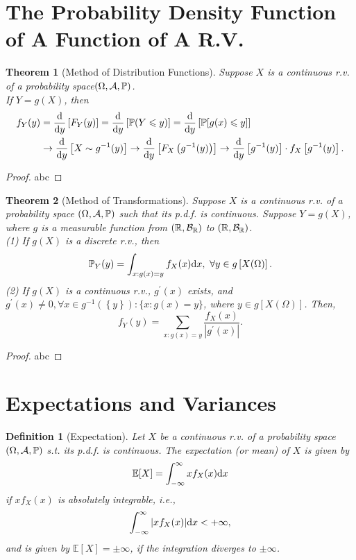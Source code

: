 \documentclass[openany,12pt]{book}
\newtheorem{theorem}{Theorem}[chapter]
\newtheorem{definition}{Definition}[chapter]
\begin{document}
\section{The Probability Density Function of A Function of A R.V.}

\begin{theorem}[Method of Distribution Functions]
  Suppose $X$ is a continuous r.v. of a probability space$(\Omega,\mathcal{A},\mathbb{P})$.\\
  If $Y=g(X)$, then
  $$\begin{aligned}
      f_Y(y) & =\frac{\mathrm{d}}{\mathrm{d} y}\left[F_Y(y)\right]=\frac{\mathrm{d}}{\mathrm{d} y}\left[\mathbb{P}(Y\leqslant y)\right]=\frac{\mathrm{d}}{\mathrm{d} y}\left[\mathbb{P}[g(x)\leqslant y]\right]                                                    \\
             & \to\frac{\mathrm{d}}{\mathrm{d} y}\left[X\sim g^{-1}(y)\right]\to\frac{\mathrm{d}}{\mathrm{d} y}\left[F_X\left(g^{-1}(y)\right)\right]\to\frac{\mathrm{d}}{\mathrm{d} y}\left[g^{-1}(y)\right]\cdot f_X\left[g^{-1}(y)\right].
    \end{aligned}
  $$
\end{theorem}

\begin{proof}
  abc
\end{proof}

\begin{theorem}[Method of Transformations]
  Suppose $X$ is a continuous r.v. of a probability space $(\Omega,\mathcal{A},\mathbb{P})$ such that its p.d.f. is continuous. Suppose $Y=g(X)$, where $g$ is a measurable function from $(\mathbb{R},\mathcal{B}_\mathbb{R})$ to $(\mathbb{R},\mathcal{B}_\mathbb{R})$.\\
  (1) If $g(X)$ is a discrete r.v., then
  $$
    \mathbb{P}_Y(y)=\int_{x:g(x)=y}{f_X(x)\mathrm{d} x},~\forall y\in g\left[X(\Omega)\right].
  $$
  (2) If $g(X)$ is a continuous r.v., $g^\prime(x)$ exists, and $g^\prime(x)\neq0, \forall x\in g^{-1}\left(\left\{y\right\}\right):\{x:g(x)=y\}$, where $y\in g\left[X(\Omega)\right]$. Then,
  $$
    f_Y(y)=\sum_{x:g(x)=y}\frac{f_X(x)}{|g^\prime(x)|}.
  $$
\end{theorem}

\begin{proof}
  abc
\end{proof}

\section{Expectations and Variances}

\begin{definition}[Expectation]
  Let $X$ be a continuous r.v. of a probability space $(\Omega,\mathcal{A},\mathbb{P})$ s.t. its p.d.f. is continuous. The expectation (or mean) of $X$ is given by
  $$
    \mathbb{E}[X]=\int_{-\infty}^{\infty}xf_X(x)\mathrm{d} x
  $$
  if $xf_X(x)$ is absolutely integrable, i.e.,
  $$
    \int_{-\infty}^{\infty}{|xf_X(x)|\mathrm{d} x}<+\infty,
  $$
  and is given by $\mathbb{E}[X]=\pm\infty$, if the integration diverges to $\pm\infty$.
\end{definition}
\end{document}
